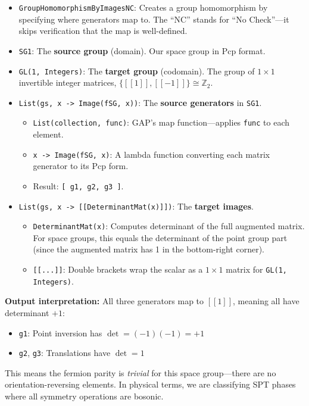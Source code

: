 \documentclass{SciPost}
\begin{document}
\begin{itemize}
    \item \texttt{GroupHomomorphismByImagesNC}: Creates a group homomorphism by specifying where generators map to. The ``NC'' stands for ``No Check''---it skips verification that the map is well-defined.
    
    \item \texttt{SG1}: The \textbf{source group} (domain). Our space group in Pcp format.
    
    \item \texttt{GL(1, Integers)}: The \textbf{target group} (codomain). The group of $1 \times 1$ invertible integer matrices, $\{[[1]], [[-1]]\} \cong \mathbb{Z}_2$.
    
    \item \texttt{List(gs, x -> Image(fSG, x))}: The \textbf{source generators} in \texttt{SG1}.
    \begin{itemize}
        \item \texttt{List(collection, func)}: GAP's map function---applies \texttt{func} to each element.
        \item \texttt{x -> Image(fSG, x)}: A lambda function converting each matrix generator to its Pcp form.
        \item Result: \texttt{[ g1, g2, g3 ]}.
    \end{itemize}
    
    \item \texttt{List(gs, x -> [[DeterminantMat(x)]])}: The \textbf{target images}.
    \begin{itemize}
        \item \texttt{DeterminantMat(x)}: Computes determinant of the full augmented matrix. For space groups, this equals the determinant of the point group part (since the augmented matrix has 1 in the bottom-right corner).
        \item \texttt{[[...]]}: Double brackets wrap the scalar as a $1 \times 1$ matrix for \texttt{GL(1, Integers)}.
    \end{itemize}
\end{itemize}

\textbf{Output interpretation:} All three generators map to $[[1]]$, meaning all have determinant $+1$:
\begin{itemize}
    \item \texttt{g1}: Point inversion has $\det = (-1)(-1) = +1$
    \item \texttt{g2}, \texttt{g3}: Translations have $\det = 1$
\end{itemize}
This means the fermion parity is \textit{trivial} for this space group---there are no orientation-reversing elements. In physical terms, we are classifying SPT phases where all symmetry operations are bosonic.
\end{document}
